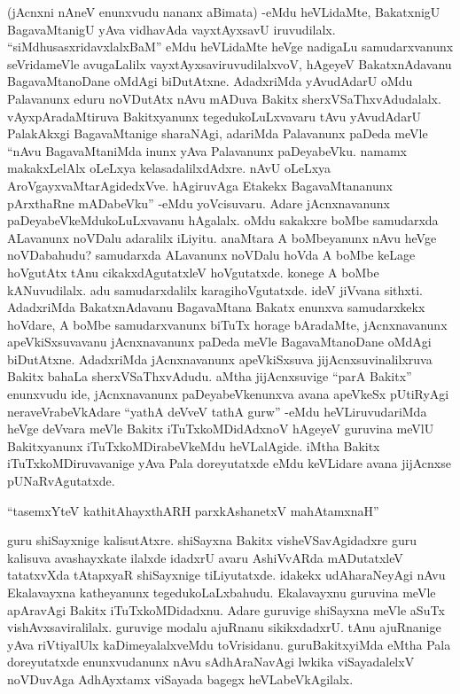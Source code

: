 (jAcnxni nAneV enunxvudu nananx aBimata) -eMdu heVLidaMte, BakatxnigU BagavaMtanigU yAva vidhavAda vayxtAyxsavU iruvudilalx. ``siMdhusasxridavxlalxBaM'' eMdu heVLidaMte heVge nadigaLu samudarxvanunx seVridameVle avugaLalilx vayxtAyxsaviruvudilalxvoV, hAgeyeV BakatxnAdavanu BagavaMtanoDane oMdAgi biDutAtxne. AdadxriMda yAvudAdarU oMdu Palavanunx eduru noVDutAtx nAvu mADuva Bakitx sherxVSaThxvAdudalalx. vAyxpAradaMtiruva Bakitxyanunx tegedukoLuLxvavaru tAvu yAvudAdarU PalakAkxgi BagavaMtanige sharaNAgi, adariMda Palavanunx paDeda meVle ``nAvu BagavaMtaniMda inunx yAva Palavanunx paDeyabeVku. namamx makakxLelAlx oLeLxya kelasadalilxdAdxre. nAvU oLeLxya AroVgayxvaMtarAgidedxVve. hAgiruvAga Etakekx BagavaMtananunx pArxthaRne mADabeVku'' -eMdu yoVcisuvaru. Adare jAcnxnavanunx paDeyabeVkeMdukoLuLxvavanu hAgalalx. oMdu sakakxre boMbe samudarxda ALavanunx noVDalu adaralilx iLiyitu. anaMtara A boMbeyanunx nAvu heVge noVDabahudu? samudarxda ALavanunx noVDalu hoVda A boMbe keLage hoVgutAtx tAnu cikakxdAgutatxleV hoVgutatxde. konege A boMbe kANuvudilalx. adu samudarxdalilx karagihoVgutatxde. ideV jiVvana sithxti. AdadxriMda BakatxnAdavanu BagavaMtana Bakatx enunxva samudarxkekx hoVdare, A boMbe samudarxvanunx biTuTx horage bAradaMte, jAcnxnavanunx apeVkiSxsuvavanu jAcnxnavanunx paDeda meVle BagavaMtanoDane oMdAgi biDutAtxne. AdadxriMda jAcnxnavanunx apeVkiSxsuva jijAcnxsuvinalilxruva Bakitx bahaLa sherxVSaThxvAdudu. aMtha jijAcnxsuvige ``parA Bakitx'' enunxvudu ide, jAcnxnavanunx paDeyabeVkenunxva avana apeVkeSx pUtiRyAgi neraveVrabeVkAdare ``yathA deVveV tathA gurw'' -eMdu heVLiruvudariMda heVge deVvara meVle Bakitx iTuTxkoMDidAdxnoV hAgeyeV guruvina meVlU Bakitxyanunx iTuTxkoMDirabeVkeMdu heVLalAgide. iMtha Bakitx iTuTxkoMDiruvavanige yAva Pala doreyutatxde eMdu keVLidare avana jijAcnxse pUNaRvAgutatxde.

\begin{shloka}
``tasemxYteV kathitAhayxthARH parxkAshanetxV mahAtamxnaH''
\end{shloka}

guru shiSayxnige kalisutAtxre. shiSayxna Bakitx visheVSavAgidadxre guru kalisuva avashayxkate ilalxde idadxrU avaru AshiVvARda mADutatxleV tatatxvXda tAtapxyaR shiSayxnige tiLiyutatxde. idakekx udAharaNeyAgi nAvu Ekalavayxna katheyanunx tegedukoLaLxbahudu. Ekalavayxnu guruvina meVle apAravAgi Bakitx iTuTxkoMDidadxnu. Adare guruvige shiSayxna meVle aSuTx vishAvxsaviralilalx. guruvige modalu ajuRnanu sikikxdadxrU. tAnu ajuRnanige yAva riVtiyalUlx kaDimeyalalxveMdu toVrisidanu. guruBakitxyiMda eMtha Pala doreyutatxde enunxvudanunx nAvu sAdhAraNavAgi lwkika viSayadalelxV noVDuvAga AdhAyxtamx viSayada bagegx heVLabeVkAgilalx.


